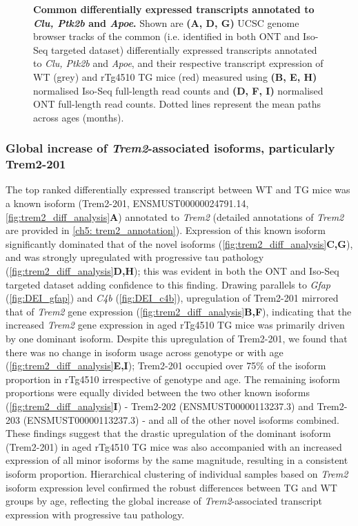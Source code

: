 \begin{figure}[htp]
	\captionsetup{width=0.95\textwidth}
	\label{fig:diffcommon_2}
	\caption[Common differentially expressed transcripts annotated to \textit{Clu, Ptk2b} and \textit{Apoe}]%
	{\textbf{Common differentially expressed transcripts annotated to \textit{Clu, Ptk2b} and \textit{Apoe}.} Shown are \textbf{(A, D, G)} UCSC genome browser tracks of the common (i.e. identified in both ONT and Iso-Seq targeted dataset) differentially expressed transcripts annotated to \textit{Clu, Ptk2b} and \textit{Apoe}, and their respective transcript expression of WT (grey) and rTg4510 TG mice (red) measured using \textbf{(B, E, H)} normalised Iso-Seq full-length read counts and \textbf{(D, F, I)} normalised ONT full-length read counts. Dotted lines represent the mean paths across ages (months).}   
\end{figure}

\clearpage
\subsubsection{Global increase of \textit{Trem2}-associated isoforms, particularly Trem2-201}
\label{trem2_diff}
The top ranked differentially expressed transcript between WT and TG mice was a known isoform (Trem2-201, ENSMUST00000024791.14, \cref{fig:trem2_diff_analysis}\textbf{A}) annotated to \textit{Trem2} (detailed annotations of \textit{Trem2} are provided in \cref{ch5: trem2_annotation}). Expression of this known isoform significantly dominated that of the novel isoforms (\cref{fig:trem2_diff_analysis}\textbf{C,G}), and was strongly upregulated with progressive tau pathology (\cref{fig:trem2_diff_analysis}\textbf{D,H}); this was evident in both the ONT and Iso-Seq targeted dataset adding confidence to this finding. Drawing parallels to \textit{Gfap} (\cref{fig:DEI_gfap}) and \textit{C4b} (\cref{fig:DEI_c4b}), upregulation of Trem2-201 mirrored that of \textit{Trem2} gene expression (\cref{fig:trem2_diff_analysis}\textbf{B,F}), indicating that the increased \textit{Trem2} gene expression in aged rTg4510 TG mice was primarily driven by one dominant isoform. Despite this upregulation of Trem2-201, we found that there was no change in isoform usage across genotype or with age (\cref{fig:trem2_diff_analysis}\textbf{E,I}); Trem2-201 occupied over 75\% of the isoform proportion in rTg4510 irrespective of genotype and age. The remaining isoform proportions were equally divided between the two other known isoforms (\cref{fig:trem2_diff_analysis}\textbf{I}) - Trem2-202 (ENSMUST00000113237.3) and Trem2-203 (ENSMUST00000113237.3) - and all of the other novel isoforms combined. These findings suggest that the drastic upregulation of the dominant isoform (Trem2-201) in aged rTg4510 TG mice was also accompanied with an increased expression of all minor isoforms by the same magnitude, resulting in a consistent isoform proportion. Hierarchical clustering of individual samples based on \textit{Trem2} isoform expression level confirmed the robust differences between TG and WT groups by age, reflecting the global increase of \textit{Trem2}-associated transcript expression with progressive tau pathology.  

